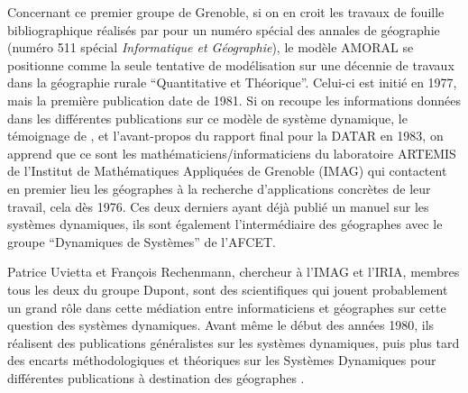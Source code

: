Concernant ce premier groupe de Grenoble, si on en croit les travaux de fouille bibliographique réalisés par \textcite{Rey1983} pour un numéro spécial des annales de géographie (numéro 511 spécial \textit{Informatique et Géographie}), le modèle AMORAL se positionne comme la seule tentative de modélisation sur une décennie de travaux dans la géographie rurale \enquote{Quantitative et Théorique}. Celui-ci est initié en 1977, mais la première publication date de 1981. Si on recoupe les informations données dans les différentes publications sur ce modèle de système dynamique, le témoignage de \textcite{LeBerre1987}, et l'avant-propos du rapport final pour la DATAR en 1983, on apprend que ce sont les mathématiciens/informaticiens du laboratoire ARTEMIS de l’Institut de Mathématiques Appliquées de Grenoble (IMAG) qui contactent en premier lieu les géographes à la recherche d’applications concrètes de leur travail, cela dès 1976. Ces deux derniers ayant déjà publié un manuel sur les systèmes dynamiques, ils sont également l'intermédiaire des géographes avec le groupe \enquote{Dynamiques de Systèmes} de l'AFCET.

Patrice Uvietta et François Rechenmann, chercheur à l'IMAG et l'IRIA, membres tous les deux du groupe Dupont, sont des scientifiques qui jouent probablement un grand rôle dans cette médiation entre informaticiens et géographes sur cette question des systèmes dynamiques. Avant même le début des années 1980, ils réalisent des publications généralistes \autocite{Rechenmann1977} sur les systèmes dynamiques, puis plus tard des encarts méthodologiques et théoriques sur les Systèmes Dynamiques pour différentes publications à destination des géographes \autocites{Rechenmann1976, Geopoint1984, CGR1983, Guermond1984}.


